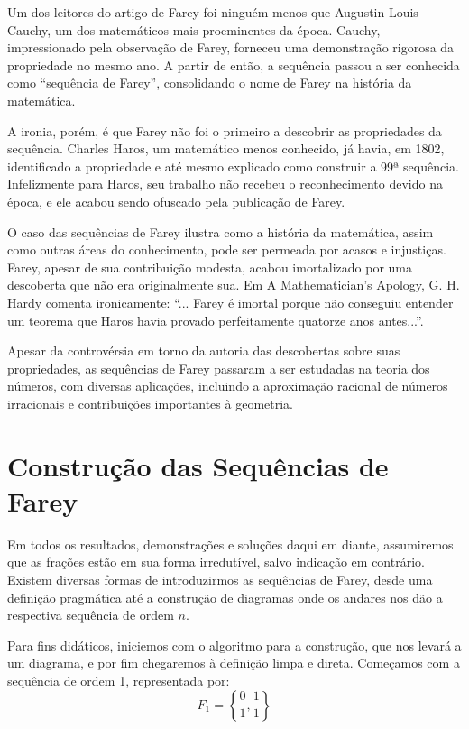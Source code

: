 \documentclass{hipatia}
\theoremstyle{definition} %
\begin{document}
Um dos leitores do artigo de Farey foi ninguém menos que Augustin-Louis Cauchy, um dos matemáticos mais proeminentes da época. Cauchy, impressionado pela observação de Farey, forneceu uma demonstração rigorosa da propriedade no mesmo ano. A partir de então, a sequência passou a ser conhecida como ``sequência de Farey'', consolidando o nome de Farey na história da matemática.

A ironia, porém, é que Farey não foi o primeiro a descobrir as propriedades da sequência. Charles Haros, um matemático menos conhecido, já havia, em 1802, identificado a propriedade e até mesmo explicado como construir a 99ª sequência. Infelizmente para Haros, seu trabalho não recebeu o reconhecimento devido na época, e ele acabou sendo ofuscado pela publicação de Farey.

O caso das sequências de Farey ilustra como a história da matemática, assim como outras áreas do conhecimento, pode ser permeada por acasos e injustiças. Farey, apesar de sua contribuição modesta, acabou imortalizado por uma descoberta que não era originalmente sua. Em A Mathematician's Apology, G. H. Hardy comenta ironicamente: ``... Farey é imortal porque não conseguiu entender um teorema que Haros havia provado perfeitamente quatorze anos antes...''.

Apesar da controvérsia em torno da autoria das descobertas sobre suas propriedades, as sequências de Farey passaram a ser estudadas na teoria dos números, com diversas aplicações, incluindo a aproximação racional de números irracionais e contribuições importantes à geometria. 



\section{Construção das Sequências de Farey}

Em todos os resultados, demonstrações e soluções daqui em diante, assumiremos que as frações estão em sua forma irredutível, salvo indicação em contrário. Existem diversas formas de introduzirmos as sequências de Farey, desde uma definição pragmática até a construção de diagramas onde os andares nos dão a respectiva sequência de ordem $n$.

Para fins didáticos, iniciemos com o algoritmo para a construção, que nos levará a um diagrama, e por fim chegaremos à definição limpa e direta. Começamos com a sequência de ordem 1, representada por:
\[
F_1 = \left\{ \frac{0}{1}, \frac{1}{1} \right\}
\]
\end{document}
